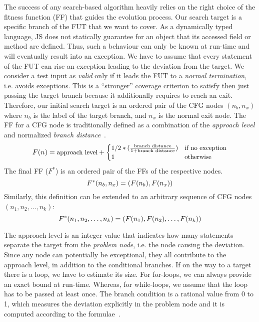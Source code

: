 The success of any search-based algorithm heavily relies on the right choice of the fitness function (FF) that guides the evolution process. Our search target is a specific branch of the FUT that we want to cover. As a dynamically typed language, JS does not statically guarantee for an object that its accessed field or method are defined. Thus, such a behaviour can only be known at run-time and will eventually result into an exception. We have to assume that every statement of the FUT can rise an exception leading to the deviation from the target. We consider a test input as \emph{valid} only if it leads the FUT to a \emph{normal termination}, i.e. avoids exceptions. This is a ``stronger'' coverage criterion to satisfy then just passing the target branch because it additionally requires to reach an exit. Therefore, our initial search target is an ordered pair of the CFG nodes $(n_b, n_x)$ where $n_b$ is the label of the target branch, and $n_x$ is the normal exit node. The FF for a CFG node is traditionally defined as a combination of the \emph{approach level} and normalized \emph{branch distance}~\cite{arcuri2010does}.
\begin{equation}
\footnotesize
F(n) = \text{approach level} +
\begin{cases}
 1/2 * (\frac{\text{branch distance}}{1 + \text{branch distance}}) & \text{if no exception}\\
 1                                  & \text{otherwise}
\end{cases}
\end{equation}
The final FF ($F^*$) is an ordered pair of the FFs of the respective nodes.
\begin{equation}
\footnotesize
F^*(n_b, n_x) = (F(n_b), F(n_x))
\end{equation}
Similarly, this definition can be extended to an arbitrary sequence of CFG nodes $(n_1, n_2, \ldots, n_k)$:
 \begin{equation}
\footnotesize
F^*(n_1, n_2, \ldots, n_k) = (F(n_1), F(n_2), \ldots, F(n_k))
\end{equation}

The approach level is an integer value that indicates how many statements separate the target from the \emph{problem node}, i.e. the node causing the deviation. Since any node can potentially be exceptional, they all contribute to the approach level, in addition to the conditional branches. If on the way to a target there is a loop, we have to estimate its size. For for-loops, we can always provide an exact bound at run-time. Whereas, for while-loops, we assume that the loop has to be passed at least once. The branch condition is a rational value from 0 to 1, which measures the deviation explicitly in the problem node and it is computed according to the formulae~\cite{tracey1998automated}.
